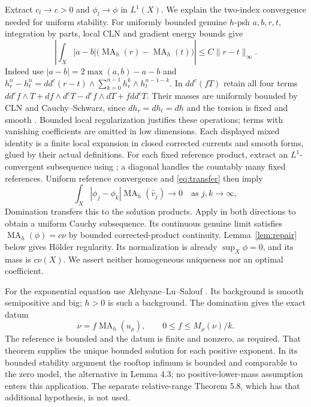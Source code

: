 \documentclass[11pt]{article}
\newcommand{\ddc}{dd^c}
\newcommand{\MA}{\operatorname{MA}}
\begin{document}
Extract $c_l\to c>0$ and $\phi_l\to\phi$ in $L^1(X)$.
We explain the two-index convergence needed for uniform stability.
For uniformly bounded genuine $h$-psh $a,b,r,t$, integration by parts,
local CLN and gradient energy bounds give
\begin{equation}\label{eq:transfer}
 \left|\int_X|a-b|\bigl(\MA_h(r)-\MA_h(t)\bigr)\right|
 \leq C\|r-t\|_\infty.
\end{equation}
Indeed use $|a-b|=2\max(a,b)-a-b$ and
$h_r^n-h_t^n=\ddc(r-t)\wedge\sum_{k=0}^{n-1}h_r^k\wedge h_t^{n-1-k}$.
In $\ddc(fT)$ retain all four terms
$\ddc f\wedge T+df\wedge d^cT-d^cf\wedge dT+f\ddc T$.
Their masses are uniformly bounded by CLN and Cauchy--Schwarz, since
$dh_r=dh_t=dh$ and the torsion is fixed and smooth
\cite[Propositions 1.4 and 1.5]{Ngu}. Bounded local regularization
justifies these operations; terms with vanishing coefficients are
omitted in low dimensions.
Each displayed mixed identity is a finite local expansion in closed
corrected currents and smooth forms, glued by their actual definitions.
For each fixed reference product, extract an $L^1$-convergent subsequence
using \cite[Lemma 2.1 and Corollary 2.2]{KN22}; a diagonal handles
the countably many fixed references. Uniform reference convergence and
\eqref{eq:transfer} then imply
\[
 \int_X|\phi_j-\phi_k|\MA_h(\widehat v_j)\longrightarrow0
 \quad\text{as }j,k\longrightarrow\infty,
\]
Domination transfers this to the solution products. Apply
\cite[Proposition 2.4]{KN} in both directions to obtain a uniform
Cauchy subsequence. Its continuous genuine limit satisfies
$\MA_h(\phi)=c\nu$ by bounded corrected-product continuity.
Lemma~\ref{lem:repair} below gives H\"older regularity. Its normalization
is already $\sup_X\phi=0$, and its mass is $c\nu(X)$.
We assert neither homogeneous uniqueness nor an optimal coefficient.

For the exponential equation use Alehyane--Lu--Salouf
\cite[Theorem 5.1]{ALS}. Its background is smooth semipositive and big;
$h>0$ is such a background. The domination gives the exact datum
\[
 \nu=f\MA_h(u_\rho),\qquad0\leq f\leq M_\rho(\nu)/k.
\]
The reference is bounded and the datum is finite and nonzero, as
required. That theorem supplies the unique bounded solution for each
positive exponent. In its bounded stability argument the rooftop
infimum is bounded and comparable to the zero model, the alternative
in Lemma 4.3; no positive-lower-mass assumption enters this application.
The separate relative-range Theorem 5.8, which has that additional
hypothesis, is not used.
\end{document}
